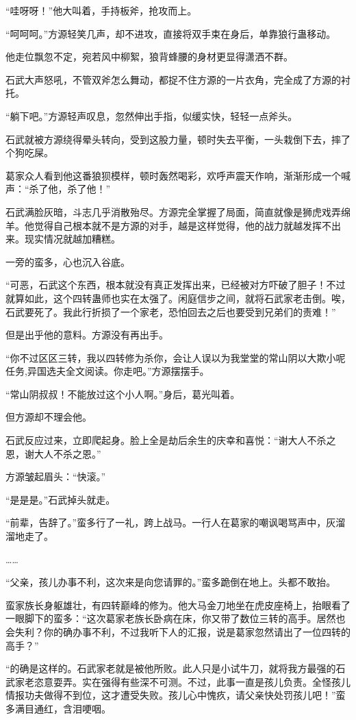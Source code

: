 \begin{this_body}
“哇呀呀！”他大叫着，手持板斧，抢攻而上。

“呵呵呵。”方源轻笑几声，却不进攻，直接将双手束在身后，单靠狼行蛊移动。

他走位飘忽不定，宛若风中柳絮，狼背蜂腰的身材更显得潇洒不群。

石武大声怒吼，不管双斧怎么舞动，都捉不住方源的一片衣角，完全成了方源的衬托。

“躺下吧。”方源轻声叹息，忽然伸出手指，似缓实快，轻轻一点斧头。

石武就被方源绕得晕头转向，受到这股力量，顿时失去平衡，一头栽倒下去，摔了个狗吃屎。

葛家众人看到他这番狼狈模样，顿时轰然喝彩，欢呼声震天作响，渐渐形成一个喊声：“杀了他，杀了他！”

石武满脸灰暗，斗志几乎消散殆尽。方源完全掌握了局面，简直就像是狮虎戏弄绵羊。他觉得自己根本就不是方源的对手，越是这样觉得，他的战力就越发挥不出来。现实情况就越加糟糕。

一旁的蛮多，心也沉入谷底。

“可恶，石武这个东西，根本就没有真正发挥出来，已经被对方吓破了胆子！不过就算如此，这个四转蛊师也实在太强了。闲庭信步之间，就将石武家老击倒。唉，石武要死了。我此行折损了一个家老，恐怕回去之后也要受到兄弟们的责难！”

但是出乎他的意料。方源没有再出手。

“你不过区区三转，我以四转修为杀你，会让人误以为我堂堂的常山阴以大欺小呢任务,异国选夫全文阅读。你走吧。”方源摆摆手。

“常山阴叔叔！不能放过这个小人啊。”身后，葛光叫着。

但方源却不理会他。

石武反应过来，立即爬起身。脸上全是劫后余生的庆幸和喜悦：“谢大人不杀之恩，谢大人不杀之恩。”

方源皱起眉头：“快滚。”

“是是是。”石武掉头就走。

“前辈，告辞了。”蛮多行了一礼，跨上战马。一行人在葛家的嘲讽喝骂声中，灰溜溜地走了。

……

“父亲，孩儿办事不利，这次来是向您请罪的。”蛮多跪倒在地上。头都不敢抬。

蛮家族长身躯雄壮，有四转巅峰的修为。他大马金刀地坐在虎皮座椅上，抬眼看了一眼脚下的蛮多：“这次葛家老族长卧病在床，你又带了数位三转的高手。居然也会失利？你的确办事不利，不过我听下人的汇报，说是葛家忽然请出了一位四转的高手？”

“的确是这样的。石武家老就是被他所败。此人只是小试牛刀，就将我方最强的石武家老恣意耍弄。实在强得有些深不可测。不过，此事一直是孩儿负责。全怪孩儿情报功夫做得不到位，这才遭受失败。孩儿心中愧疚，请父亲快处罚孩儿吧！”蛮多满目通红，含泪哽咽。


\end{this_body}
